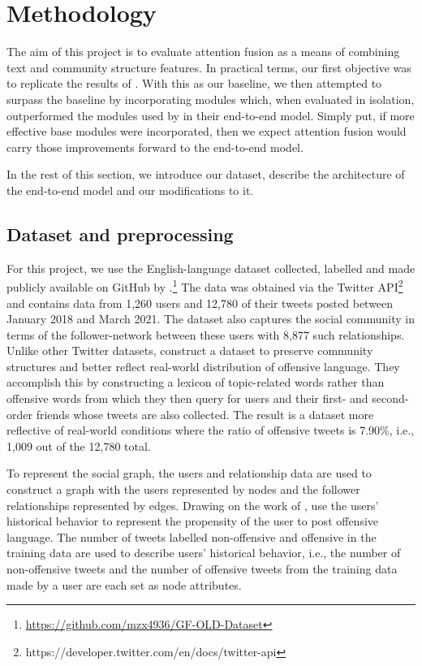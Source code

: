 \documentclass[letterpaper]{article} %
\begin{document}
\section{Methodology}

The aim of this project is to evaluate attention fusion as a means of combining text and community structure features. In practical terms, our first objective was to replicate the results of \citet{Miao2022}. With this as our baseline, we then attempted to surpass the baseline by incorporating modules which, when evaluated in isolation, outperformed the modules used by \citet{Miao2022} in their end-to-end model. Simply put, if more effective base modules were incorporated, then we expect attention fusion would carry those improvements forward to the end-to-end model.

In the rest of this section, we introduce our dataset, describe the architecture of the end-to-end model and our modifications to it. 

\subsection{Dataset and preprocessing}

For this project, we use the English-language dataset collected, labelled and made publicly available on GitHub by \citet{Miao2022}.\footnote{\url{https://github.com/mzx4936/GF-OLD-Dataset}} The data was obtained via the Twitter API\footnote{https://developer.twitter.com/en/docs/twitter-api} and contains data from 1,260 users and 12,780 of their tweets posted between January 2018 and March 2021. The dataset also captures the social community in terms of the follower-network between these users with 8,877 such relationships. Unlike other Twitter datasets, \citet{Miao2022} construct a dataset to preserve community structures and better reflect real-world distribution of offensive language. They accomplish this by constructing a lexicon of topic-related words rather than offensive words from which they then query for users and their first- and second-order friends whose tweets are also collected. The result is a dataset more reflective of real-world conditions where the ratio of offensive tweets is 7.90\%, i.e., 1,009 out of the 12,780 total.

To represent the social graph, the users and relationship data are used to construct a graph with the users represented by nodes and the follower relationships represented by edges. Drawing on the work of \citet{Mishra2019}, \citet{Miao2022} use the users' historical behavior to represent the propensity of the user to post offensive language. The number of tweets labelled non-offensive and offensive in the training data are used to describe users' historical behavior, i.e., the number of non-offensive tweets and the number of offensive tweets from the training data made by a user are each set as node attributes.
\end{document}
